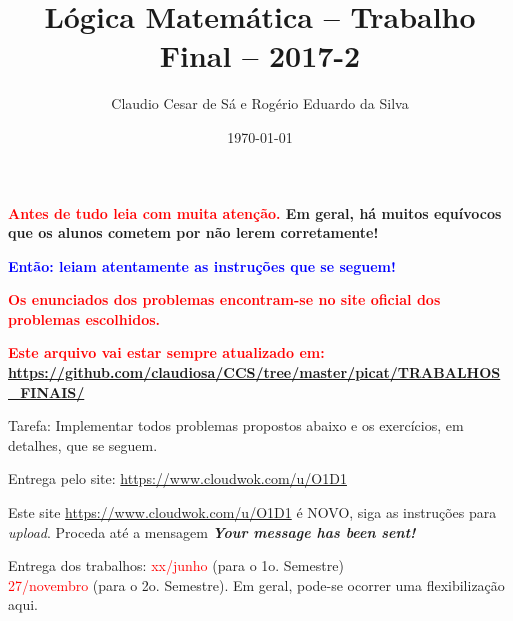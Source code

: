 \documentclass[a4paper,12pt]{article}
\title{Lógica Matemática -- Trabalho Final -- 2017-2}
\author{Claudio Cesar de Sá e Rogério Eduardo da Silva}
\date{\today}
\begin{document}
\maketitle

\begin{flushleft}


\vspace{0.5cm}
  {\bf \textcolor{red}{
Antes de tudo leia com \textbf{muita atenção}.} Em geral, há muitos equívocos
que os alunos cometem por não lerem corretamente!}


\vspace{0.5cm}
 {\bf \textcolor{blue}{Então: leiam atentamente as
instruções que se seguem!}}


\vspace{0.5cm}
  {\bf \textcolor{red}{Os enunciados dos problemas encontram-se no site oficial dos problemas escolhidos.}}


\vspace{0.5cm}
  {\bf \textcolor{red}{Este arquivo vai estar sempre atualizado em: }}\\
{\bf \textcolor{red}{\url{https://github.com/claudiosa/CCS/tree/master/picat/TRABALHOS_FINAIS/}}}

\vspace{0.5cm}
 Tarefa: Implementar todos  
 problemas propostos abaixo e os exercícios, em detalhes, que se seguem. 

\vspace{0.5cm}
 Entrega pelo site: \textcolor{red}{\url{https://www.cloudwok.com/u/O1D1}}


\vspace{0.5cm}
  Este site  \textcolor{red}{\url{https://www.cloudwok.com/u/O1D1}} é NOVO, siga as instruções para \emph{upload}. Proceda até
a mensagem \textbf{ \emph{Your message has been sent!}}

\vspace{0.5cm}
 Entrega dos trabalhos: \textcolor{red}{xx/junho} (para o 1o. Semestre)\\
\textcolor{red}{27/novembro} (para o 2o. Semestre). Em geral, pode-se
ocorrer uma flexibilização aqui.\\




\end{flushleft}
\end{document}
